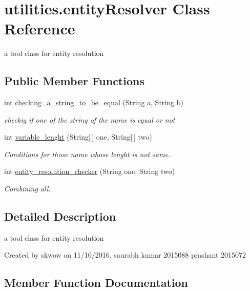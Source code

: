 \hypertarget{classutilities_1_1entity_resolver}{}\section{utilities.\+entity\+Resolver Class Reference}
\label{classutilities_1_1entity_resolver}


a tool class for entity resolution  


\subsection*{Public Member Functions}
\begin{DoxyCompactItemize}
\item 
int \hyperlink{classutilities_1_1entity_resolver_a3907a3b2ed45bcd052a354d949283350}{checking\+\_\+a\+\_\+string\+\_\+to\+\_\+be\+\_\+equal} (String a, String b)
\begin{DoxyCompactList}\small\item\em checkig if one of the string of the name is equal or not \end{DoxyCompactList}\item 
int \hyperlink{classutilities_1_1entity_resolver_a695716e282e5c008a3d72f13103f145e}{variable\+\_\+lenght} (String\mbox{[}$\,$\mbox{]} one, String\mbox{[}$\,$\mbox{]} two)
\begin{DoxyCompactList}\small\item\em Conditions for those name whose lenght is not same. \end{DoxyCompactList}\item 
int \hyperlink{classutilities_1_1entity_resolver_af9ca73ff07de65c6f70b958ab5569adf}{entity\+\_\+resolution\+\_\+checker} (String one, String two)
\begin{DoxyCompactList}\small\item\em Combining all. \end{DoxyCompactList}\end{DoxyCompactItemize}


\subsection{Detailed Description}
a tool class for entity resolution 

Created by skwow on 11/10/2016. saurabh kumar 2015088 prashant 2015072 

\subsection{Member Function Documentation}
\hypertarget{classutilities_1_1entity_resolver_a3907a3b2ed45bcd052a354d949283350}{}\label{classutilities_1_1entity_resolver_a3907a3b2ed45bcd052a354d949283350} 
